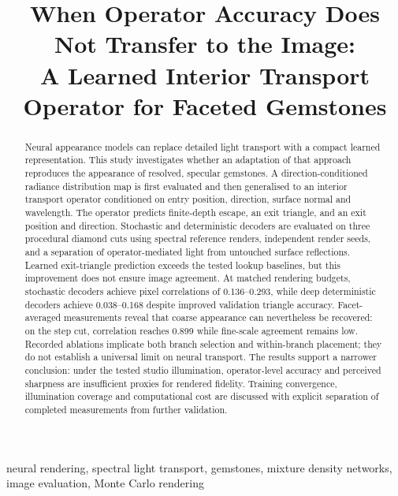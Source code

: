 \documentclass[conference]{IEEEtran}
\begin{document}
\title{When Operator Accuracy Does Not Transfer to the Image:\\
A Learned Interior Transport Operator for Faceted Gemstones}
\author{
}
\maketitle

\begin{abstract}
Neural appearance models can replace detailed light transport with a compact
learned representation. This study investigates whether an adaptation of that
approach reproduces the appearance of resolved, specular gemstones. A
direction-conditioned radiance distribution map is first evaluated and then
generalised to an interior transport operator conditioned on entry position,
direction, surface normal and wavelength. The operator predicts finite-depth
escape, an exit triangle, and an exit position and direction. Stochastic and
deterministic decoders are evaluated on three procedural diamond cuts using
spectral reference renders, independent render seeds, and a separation of
operator-mediated light from untouched surface reflections. Learned exit-triangle
prediction exceeds the tested lookup baselines, but this improvement does not
ensure image agreement. At matched rendering budgets, stochastic decoders achieve
pixel correlations of 0.136--0.293, while deep deterministic decoders achieve
0.038--0.168 despite improved validation triangle accuracy. Facet-averaged
measurements reveal that coarse appearance can nevertheless be recovered: on
the step cut, correlation reaches 0.899 while fine-scale agreement remains low.
Recorded ablations implicate both branch selection and within-branch placement;
they do not establish a universal limit on neural transport. The results support
a narrower conclusion: under the tested studio illumination, operator-level
accuracy and perceived sharpness are insufficient proxies for rendered fidelity.
Training convergence, illumination coverage and computational cost are discussed
with explicit separation of completed measurements from further validation.
\end{abstract}

\begin{IEEEkeywords}
neural rendering, spectral light transport, gemstones, mixture density networks,
image evaluation, Monte Carlo rendering
\end{IEEEkeywords}
\end{document}
